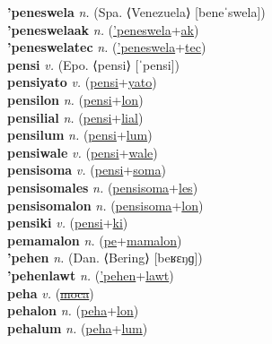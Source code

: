 \textbf{'peneswela} \textit{n.} (Spa. ⟨Venezuela⟩ [beneˈswela])
 \label{'peneswela} \\
\textbf{'peneswelaak} \textit{n.} (\hyperref['peneswela]{'peneswela}+\hyperref[ak]{ak})
 \label{'peneswelaak} \\
\textbf{'peneswelatec} \textit{n.} (\hyperref['peneswela]{'peneswela}+\hyperref[tec]{tec})
 \label{'peneswelatec} \\
\textbf{pensi} \textit{v.} (Epo. ⟨pensi⟩ [ˈpensi])
 \label{pensi} \\
\textbf{pensiyato} \textit{v.} (\hyperref[pensi]{pensi}+\hyperref[yato]{yato})
 \label{pensiyato} \\
\textbf{pensilon} \textit{n.} (\hyperref[pensi]{pensi}+\hyperref[lon]{lon})
 \label{pensilon} \\
\textbf{pensilial} \textit{n.} (\hyperref[pensi]{pensi}+\hyperref[lial]{lial})
 \label{pensilial} \\
\textbf{pensilum} \textit{n.} (\hyperref[pensi]{pensi}+\hyperref[lum]{lum})
 \label{pensilum} \\
\textbf{pensiwale} \textit{v.} (\hyperref[pensi]{pensi}+\hyperref[wale]{wale})
 \label{pensiwale} \\
\textbf{pensisoma} \textit{v.} (\hyperref[pensi]{pensi}+\hyperref[soma]{soma})
 \label{pensisoma} \\
\textbf{pensisomales} \textit{n.} (\hyperref[pensisoma]{pensisoma}+\hyperref[les]{les})
 \label{pensisomales} \\
\textbf{pensisomalon} \textit{n.} (\hyperref[pensisoma]{pensisoma}+\hyperref[lon]{lon})
 \label{pensisomalon} \\
\textbf{pensiki} \textit{v.} (\hyperref[pensi]{pensi}+\hyperref[ki]{ki})
 \label{pensiki} \\
\textbf{pemamalon} \textit{n.} (\hyperref[pe]{pe}+\hyperref[mamalon]{mamalon})
 \label{pemamalon} \\
\textbf{'pehen} \textit{n.} (Dan. ⟨Bering⟩ [beʁɛŋɡ])
 \label{'pehen} \\
\textbf{'pehenlawt} \textit{n.} (\hyperref['pehen]{'pehen}+\hyperref[lawt]{lawt})
 \label{'pehenlawt} \\
\textbf{peha} \textit{v.} (\hyperref[moca]{\sout{moca}})
 \label{peha} \\
\textbf{pehalon} \textit{n.} (\hyperref[peha]{peha}+\hyperref[lon]{lon})
 \label{pehalon} \\
\textbf{pehalum} \textit{n.} (\hyperref[peha]{peha}+\hyperref[lum]{lum})
 \label{pehalum} \\
